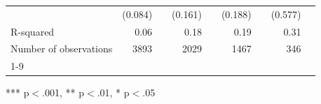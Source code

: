 \documentclass{article}
\begin{document}
\begin{table}[!h]
\begin{tabular}{lllllllll}
\multicolumn{1}{l}{} &
  \multicolumn{1}{r}{(0.084)} &
  \multicolumn{1}{l}{} &
  \multicolumn{1}{r}{(0.161)} &
  \multicolumn{1}{l}{} &
  \multicolumn{1}{r}{(0.188)} &
  \multicolumn{1}{l}{} &
  \multicolumn{1}{r}{(0.577)} &
  \multicolumn{1}{l}{} \\
\multicolumn{1}{l}{R-squared} &
  \multicolumn{1}{r}{0.06} &
  \multicolumn{1}{l}{} &
  \multicolumn{1}{r}{0.18} &
  \multicolumn{1}{l}{} &
  \multicolumn{1}{r}{0.19} &
  \multicolumn{1}{l}{} &
  \multicolumn{1}{r}{0.31} &
  \multicolumn{1}{l}{} \\
\multicolumn{1}{l}{Number of observations} &
  \multicolumn{1}{r}{3893} &
  \multicolumn{1}{l}{} &
  \multicolumn{1}{r}{2029} &
  \multicolumn{1}{l}{} &
  \multicolumn{1}{r}{1467} &
  \multicolumn{1}{l}{} &
  \multicolumn{1}{r}{346} &
  \multicolumn{1}{l}{} \\
\cline{1-9}
\end{tabular}

\footnotesize{
*** p$<$.001, ** p$<$.01, * p$<$.05
}
\end{table}
\end{document}
